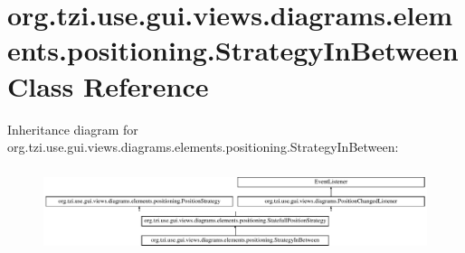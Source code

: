 \hypertarget{classorg_1_1tzi_1_1use_1_1gui_1_1views_1_1diagrams_1_1elements_1_1positioning_1_1_strategy_in_between}{\section{org.\-tzi.\-use.\-gui.\-views.\-diagrams.\-elements.\-positioning.\-Strategy\-In\-Between Class Reference}
\label{classorg_1_1tzi_1_1use_1_1gui_1_1views_1_1diagrams_1_1elements_1_1positioning_1_1_strategy_in_between}
}
Inheritance diagram for org.\-tzi.\-use.\-gui.\-views.\-diagrams.\-elements.\-positioning.\-Strategy\-In\-Between\-:\begin{figure}[H]
\begin{center}
\leavevmode
\includegraphics[height=2.500000cm]{classorg_1_1tzi_1_1use_1_1gui_1_1views_1_1diagrams_1_1elements_1_1positioning_1_1_strategy_in_between}
\end{center}
\end{figure}
